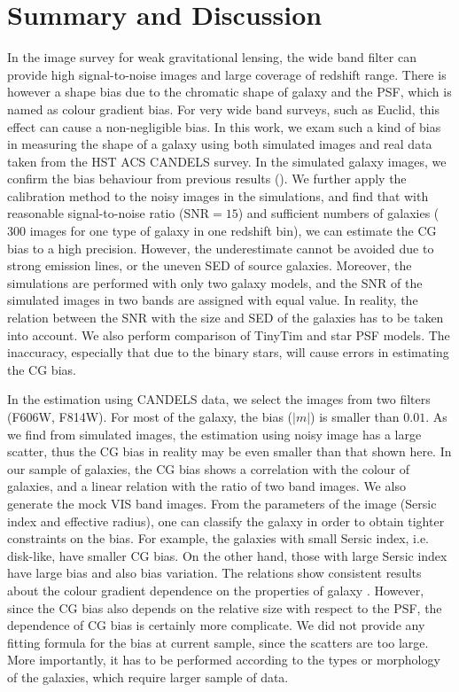 \documentclass[useAMS,usenatbib]{mnras}
\begin{document}
\section{Summary and Discussion}
In the image survey for weak gravitational lensing, the wide band
filter can provide high signal-to-noise images and large coverage of
redshift range. There is however a shape bias due to the chromatic
shape of galaxy and the PSF, which is named as colour gradient
bias. For very wide band surveys, such as Euclid, this effect can
cause a non-negligible bias.
%
In this work, we exam such a kind of bias in measuring the shape of a
galaxy using both simulated images and real data taken from the HST
ACS CANDELS survey. In the simulated galaxy images, we confirm the
bias behaviour from previous results (). We further apply the
calibration method to the noisy images in the simulations, and find
that with reasonable signal-to-noise ratio (SNR$=15$) and sufficient
numbers of galaxies ($300$ images for one type of galaxy in one
redshift bin), we can estimate the CG bias to a high precision.
However, the underestimate cannot be avoided due to strong emission
lines, or the uneven SED of source galaxies. Moreover, the simulations
are performed with only two galaxy models, and the SNR of the
simulated images in two bands are assigned with equal value. In
reality, the relation between the SNR with the size and SED of the
galaxies has to be taken into account.
%
We also perform comparison of TinyTim and star PSF models. The
inaccuracy, especially that due to the binary stars, will cause errors
in estimating the CG bias.


In the estimation using CANDELS data, we select the images from two
filters (F606W, F814W). For most of the galaxy, the bias ($|m|$) is
smaller than $0.01$.  As we find from simulated images, the estimation
using noisy image has a large scatter, thus the CG bias in reality may
be even smaller than that shown here.
%
In our sample of galaxies, the CG bias shows a correlation with the
colour of galaxies, and a linear relation with the ratio of two band
images. We also generate the mock VIS band images. From the parameters
of the image (Sersic index and effective radius), one can classify the
galaxy in order to obtain tighter constraints on the bias. For example,
the galaxies with small Sersic index, i.e. disk-like, have smaller CG
bias. On the other hand, those with large Sersic index have large bias
and also bias variation. The relations show consistent results about
the colour gradient dependence on the properties of galaxy
\citep[e.g.][]{2010MNRAS.407..144T}. However, since the CG bias also
depends on the relative size with respect to the PSF, the dependence
of CG bias is certainly more complicate. We did not provide any
fitting formula for the bias at current sample, since the scatters are
too large. More importantly, it has to be performed according to the
types or morphology of the galaxies, which require larger sample of data.
\end{document}

